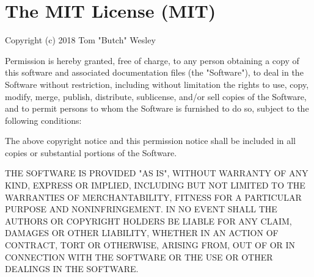 \chapter{The MIT License (MIT)}
\hypertarget{md__the_magic_apprentice_2addons_2gut_2_l_i_c_e_n_s_e}{}\label{md__the_magic_apprentice_2addons_2gut_2_l_i_c_e_n_s_e}
Copyright (c) 2018 Tom "{}\+Butch"{} Wesley

Permission is hereby granted, free of charge, to any person obtaining a copy of this software and associated documentation files (the "{}\+Software"{}), to deal in the Software without restriction, including without limitation the rights to use, copy, modify, merge, publish, distribute, sublicense, and/or sell copies of the Software, and to permit persons to whom the Software is furnished to do so, subject to the following conditions\+:

The above copyright notice and this permission notice shall be included in all copies or substantial portions of the Software.

THE SOFTWARE IS PROVIDED "{}\+AS IS"{}, WITHOUT WARRANTY OF ANY KIND, EXPRESS OR IMPLIED, INCLUDING BUT NOT LIMITED TO THE WARRANTIES OF MERCHANTABILITY, FITNESS FOR A PARTICULAR PURPOSE AND NONINFRINGEMENT. IN NO EVENT SHALL THE AUTHORS OR COPYRIGHT HOLDERS BE LIABLE FOR ANY CLAIM, DAMAGES OR OTHER LIABILITY, WHETHER IN AN ACTION OF CONTRACT, TORT OR OTHERWISE, ARISING FROM, OUT OF OR IN CONNECTION WITH THE SOFTWARE OR THE USE OR OTHER DEALINGS IN THE SOFTWARE. 